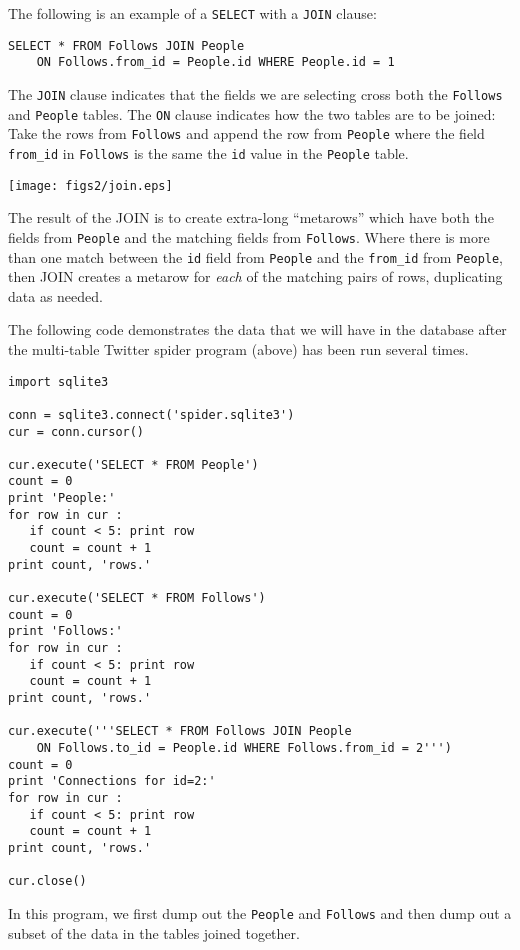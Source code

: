 The following is an example of a {\tt SELECT} with a 
{\tt JOIN} clause:

\beforeverb
\begin{verbatim}
SELECT * FROM Follows JOIN People 
    ON Follows.from_id = People.id WHERE People.id = 1
\end{verbatim}
\afterverb
%
The {\tt JOIN} clause indicates that the fields we are selecting
cross both the {\tt Follows} and {\tt People} tables.  The {\tt ON}
clause indicates how the two tables are to be joined:  Take the rows
from {\tt Follows} and append the row from {\tt People} where the
field \verb"from_id" in {\tt Follows} is the same the {\tt id} value
in the {\tt People} table.

\beforefig
\centerline{\texttt{[image: figs2/join.eps]}}
\afterfig

The result of the JOIN is to create extra-long ``metarows'' which have both 
the fields from {\tt People} and the matching fields from {\tt Follows}.
Where there is more than one match between the {\tt id} field from {\tt People}
and the \verb"from_id" from {\tt People}, then JOIN creates a metarow 
for \emph{each} of the matching pairs of rows, duplicating data as needed.

The following code demonstrates the data that we will have in the 
database after the multi-table Twitter spider program (above) has
been run several times.

\beforeverb
\begin{verbatim}
import sqlite3

conn = sqlite3.connect('spider.sqlite3')
cur = conn.cursor()

cur.execute('SELECT * FROM People')
count = 0
print 'People:'
for row in cur :
   if count < 5: print row
   count = count + 1
print count, 'rows.'

cur.execute('SELECT * FROM Follows')
count = 0
print 'Follows:'
for row in cur :
   if count < 5: print row
   count = count + 1
print count, 'rows.'

cur.execute('''SELECT * FROM Follows JOIN People 
    ON Follows.to_id = People.id WHERE Follows.from_id = 2''')
count = 0
print 'Connections for id=2:'
for row in cur :
   if count < 5: print row
   count = count + 1
print count, 'rows.'

cur.close()
\end{verbatim}
\afterverb
%
In this program, we first dump out the {\tt People}
and {\tt Follows} and then dump out a subset of the
data in the tables joined together.

